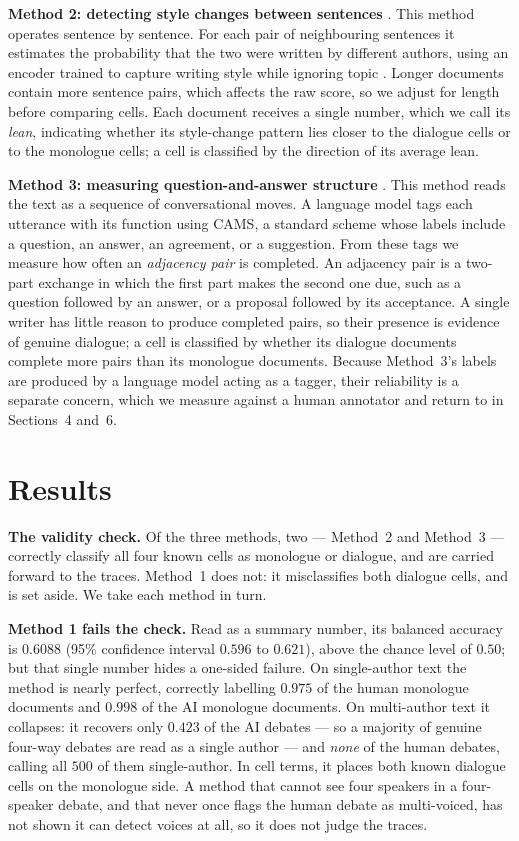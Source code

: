 \documentclass[10pt,twocolumn]{article}
\begin{document}
\textbf{Method 2: detecting style changes between sentences} \cite{schmidt2025}. This method operates
sentence by sentence. For each pair of neighbouring sentences it estimates the probability that the
two were written by different authors, using an encoder trained to capture writing style while
ignoring topic \cite{patel2025}. Longer documents contain more sentence pairs, which affects the raw
score, so we adjust for length before comparing cells. Each document receives a single number, which
we call its \emph{lean}, indicating whether its style-change pattern lies closer to the dialogue cells
or to the monologue cells; a cell is classified by the direction of its average lean.

\textbf{Method 3: measuring question-and-answer structure} \cite{duran2022,schegloff1973}. This
method reads the text as a sequence of conversational moves. A language model tags each utterance with
its function using CAMS, a standard scheme whose labels include a question, an answer, an agreement,
or a suggestion. From these tags we measure how often an \emph{adjacency pair} is completed. An
adjacency pair is a two-part exchange in which the first part makes the second one due, such as a
question followed by an answer, or a proposal followed by its acceptance. A single writer has little
reason to produce completed pairs, so their presence is evidence of genuine dialogue; a cell is
classified by whether its dialogue documents complete more pairs than its monologue documents. Because
Method~3's labels are produced by a language model acting as a tagger, their reliability is a separate
concern, which we measure against a human annotator and return to in Sections~4 and~6.

\section{Results}
\textbf{The validity check.} Of the three methods, two --- Method~2 and Method~3 --- correctly classify
all four known cells as monologue or dialogue, and are carried forward to the traces. Method~1 does
not: it misclassifies both dialogue cells, and is set aside. We take each method in turn.

\textbf{Method 1 fails the check.} Read as a summary number, its balanced accuracy is $0.6088$ (95\%
confidence interval $0.596$ to $0.621$), above the chance level of $0.50$; but that single number
hides a one-sided failure. On single-author text the method is nearly perfect, correctly labelling
$0.975$ of the human monologue documents and $0.998$ of the AI monologue documents. On multi-author
text it collapses: it recovers only $0.423$ of the AI debates --- so a majority of genuine four-way
debates are read as a single author --- and \emph{none} of the human debates, calling all $500$ of
them single-author. In cell terms, it places both known dialogue cells on the monologue side. A method
that cannot see four speakers in a four-speaker debate, and that never once flags the human debate as
multi-voiced, has not shown it can detect voices at all, so it does not judge the traces.
\end{document}
